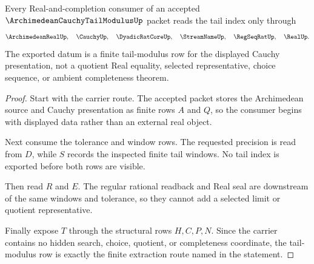 \begin{theorem}
\label{thm:archimedean-cauchy-tail-modulus-extraction-route}
Every Real-and-completion consumer of an accepted $\ArchimedeanCauchyTailModulusUp$ packet reads the tail index only through
$$
\ArchimedeanRealUp,\quad \CauchyUp,\quad \DyadicRatCoreUp,\quad \StreamNameUp,\quad \RegSeqRatUp,\quad \RealUp .
$$
The exported datum is a finite tail-modulus row for the displayed Cauchy presentation, not a quotient Real equality, selected representative, choice sequence, or ambient completeness theorem.
\end{theorem}
\begin{proof}
Start with the carrier route. The accepted packet stores the Archimedean source and Cauchy presentation as finite rows $A$ and $Q$, so the consumer begins with displayed data rather than an external real object.

Next consume the tolerance and window rows. The requested precision is read from $D$, while $S$ records the inspected finite tail windows. No tail index is exported before both rows are visible.

Then read $R$ and $E$. The regular rational readback and Real seal are downstream of the same windows and tolerance, so they cannot add a selected limit or quotient representative.

Finally expose $T$ through the structural rows $H,C,P,N$. Since the carrier contains no hidden search, choice, quotient, or completeness coordinate, the tail-modulus row is exactly the finite extraction route named in the statement.
\end{proof}


\begin{closurestatus}{\ArchimedeanCauchyTailModulusUp}
  \theoryclosure{\seedClosure}
  \formalstatus{\formalTargetV}
\end{closurestatus}
